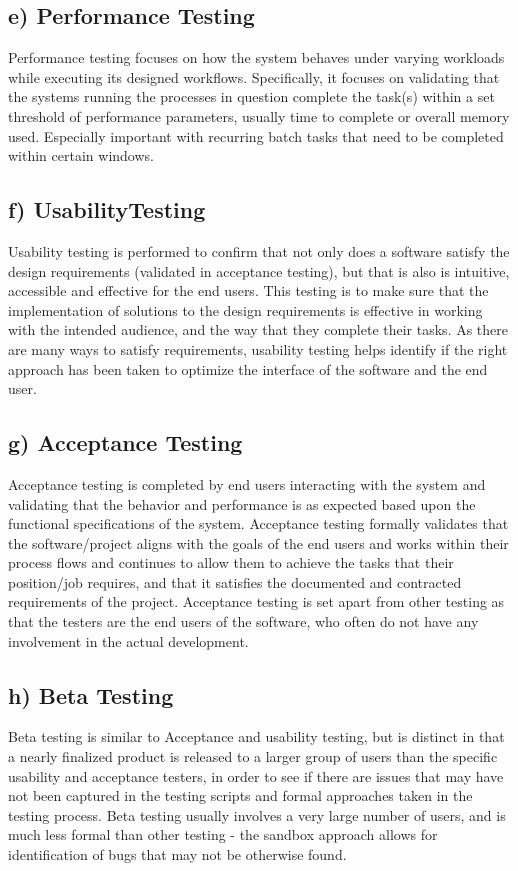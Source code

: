 \documentclass[11pt, oneside]{article}   	%
\begin{document}
\subsection*{e) Performance Testing}
Performance testing focuses on how the system behaves under varying workloads while executing its designed workflows.  Specifically, it focuses on validating that the systems running the processes in question complete the task(s) within a set threshold of performance parameters, usually time to complete or overall memory used. Especially important with recurring batch tasks that need to be completed within certain windows.  

\subsection*{f) UsabilityTesting}
Usability testing is performed to confirm that not only does a software satisfy the design requirements (validated in acceptance testing), but that is also is intuitive, accessible and effective for the end users.  This testing is to make sure that the implementation of solutions to the design requirements is effective in working with the intended audience, and the way that they complete their tasks.  As there are many ways to satisfy requirements, usability testing helps identify if the right approach has been taken to optimize the interface of the software and the end user.

\subsection*{g) Acceptance Testing}
Acceptance testing is completed by end users interacting with the system and validating that the behavior and performance is as expected based upon the functional specifications of the system.  Acceptance testing formally validates that the software/project aligns with the goals of the end users and works within their process flows and continues to allow them to achieve the tasks that their position/job requires, and that it satisfies the documented and contracted requirements of the project.  Acceptance testing is set apart from other testing as that the testers are the end users of the software, who often do not have any involvement in the actual development.

\subsection*{h) Beta Testing}
Beta testing is similar to Acceptance and usability testing, but is distinct in that a nearly finalized product is released to a larger group of users than the specific usability and acceptance testers, in order to see if there are issues that may have not been captured in the testing scripts and formal approaches taken in the testing process.  Beta testing usually involves a very large number of users, and is much less formal than other testing - the sandbox approach allows for identification of bugs that may not be otherwise found.
\end{document}
